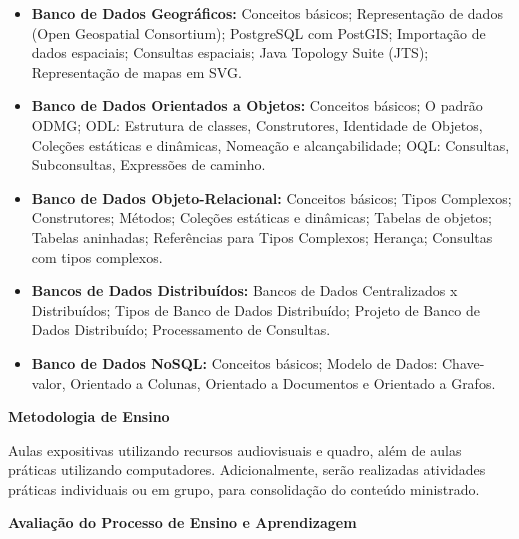 \begin{itemize}

 \item \textbf{Banco de Dados Geográficos:} Conceitos básicos;	Representação de dados (Open Geospatial Consortium); PostgreSQL com PostGIS; Importação de dados espaciais; Consultas espaciais; Java Topology Suite (JTS); Representação de mapas em SVG.
 
 \item \textbf{Banco de Dados Orientados a Objetos:} Conceitos básicos; O padrão ODMG; ODL: Estrutura de classes, Construtores, Identidade de Objetos, Coleções estáticas e dinâmicas, Nomeação e alcançabilidade; OQL: Consultas, Subconsultas, Expressões de caminho.

 \item \textbf{Banco de Dados Objeto-Relacional:} Conceitos básicos; Tipos Complexos; Construtores;	Métodos; Coleções estáticas e dinâmicas; Tabelas de objetos; Tabelas aninhadas; Referências para Tipos Complexos; Herança; Consultas com tipos complexos.
 
 \item \textbf{Bancos de Dados Distribuídos:} Bancos de Dados Centralizados x Distribuídos; Tipos de Banco de Dados Distribuído; Projeto de Banco de Dados Distribuído; Processamento de Consultas.

\item \textbf{Banco de Dados NoSQL:} Conceitos básicos; Modelo de Dados: Chave-valor, Orientado a Colunas, Orientado a Documentos e Orientado a Grafos.

\end{itemize}

\begin{snugshade}\begin{center}\textbf{
    Metodologia de Ensino
}\end{center}\end{snugshade} 

\noindent
   Aulas expositivas utilizando recursos audiovisuais e quadro, além de aulas práticas utilizando computadores. Adicionalmente, serão realizadas atividades práticas individuais ou em grupo, para consolidação do conteúdo ministrado.

\begin{snugshade}\begin{center}\textbf{
    Avaliação do Processo de Ensino e Aprendizagem
}\end{center}\end{snugshade}   

